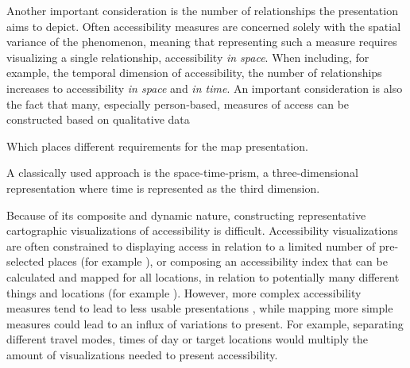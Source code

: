 Another important consideration is
the number of relationships the presentation aims to depict.
Often accessibility measures are concerned solely with
the spatial variance of the phenomenon, meaning that
representing such a measure requires visualizing a single relationship,
accessibility \textit{in space}.
When including, for example, the temporal dimension of accessibility,
the number of relationships increases to
accessibility \textit{in space} and \textit{in time}.
An important consideration is also the fact that
many, especially person-based, measures of access can be constructed
based on qualitative data

Which places different requirements for the map presentation.

A classically used approach is the space-time-prism,
a three-dimensional representation where
time is represented as the third dimension.


Because of its composite and dynamic nature,
constructing representative cartographic visualizations of accessibility is difficult.
Accessibility visualizations are often constrained
to displaying access in relation to
a limited number of pre-selected places (for example \textcite{wei2018}),
or composing an accessibility index
that can be calculated and mapped for all locations,
in relation to potentially many different things and locations
(for example \textcite{kim2019}).
However, more complex accessibility measures tend to lead to
less usable presentations \parencite{te2014},
while mapping more simple measures could lead to an influx of variations to present.
For example, separating different travel modes, times of day or target locations
would multiply the amount of visualizations needed to present accessibility.




